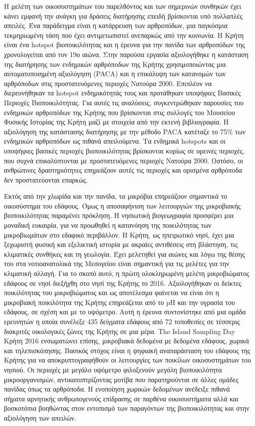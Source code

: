\documentclass[11pt]{article}
\begin{document}
Η μελέτη των οικοσυστημάτων του παρελθόντος και των σημερινών συνθηκών έχει κάνει εμφανή την ανάγκη για
δράσεις διατήρησης επειδή βρίσκονται υπό πολλαπλές απειλές.
Ένα παράδειγμα είναι η κατάρρευση των αρθροπόδων, μια παγκόσμια τεκμηριωμένη
τάση που έχει αντιμετωπιστεί ανεπαρκώς από την κοινωνία.
Η Κρήτη είναι ένα hotspot βιοποικιλότητας και η έρευνα για την πανίδα των αρθροπόδων της χρονολογείται από τον 19ο αιώνα.
Στην παρούσα εργασία αξιολογήθηκε η κατάσταση της διατήρησης των ενδημικών αρθρόποδων της Κρήτης χρησιμοποιώντας
μια αυτοματοποιημένη αξιολόγηση (\textlatin{PACA}) και η επικάλυψη των κατανομών των αρθρόποδων
στις προστατευόμενες περιοχές Νατούρα 2000. Επιπλέον 
να διερευνήθηκαν τα \textlatin{hotspot} ενδημικότητάς τους και προτάθηκαν υποψήφιες Βασικές Περιοχές Βιοποικιλότητας.
Για αυτές τις αναλύσεις, συγκεντρώθηκαν παρουσίες του ενδημικών αρθροπόδων της Κρήτης
που βρίσκονται στις συλλογές του Μουσείου Φυσικής Ιστορίας της
Κρήτη μαζί με στοιχεία από την εκτενή βιβλιογραφία. Η αξιολόγηση της κατάστασης διατήρησης με την μέθοδο PACA
κατέταξε το 75\% των ενδημικών αρθροπόδων ως πιθανά απειλούμενα.
Τα ενδημικά \textlatin{hotspots} και οι υποψήφιες βασικές περιοχές βιοποικιλότητας βρίσκονται κυρίως σε
ορεινές περιοχές, που συχνά επικαλύπτονται με προστατευόμενες περιοχές Νατούρα 2000.
Ωστόσο, οι ανθρώπινες δραστηριότητες επηρεάζουν αυτές τις περιοχές και ορισμένα αρθρόποδα δεν 
προστατεύονται επαρκώς.

Εκτός από την χλωρίδα και την πανίδα, τα μικρόβια επηρεάζουν σημαντικά το οικοσύστημα του εδάφους.
Όμως η αποσαφήνιση των λειτουργιών της μικροβιακής βιοποικιλότητας παραμένει πρόκληση.
Η νησιωτική βιογεωγραφία προσφέρει μια μοναδική ευκαιρία, για να προωθηθεί η κατανόηση
της ποικιλότητας των μικροβιωμάτων στο εδαφικό περιβάλλον.
Η Κρήτη, ως ηπειρωτικό νησί, έχει μια ξεχωριστή φυσική και εξελικτική ιστορία
με ακραίες αντιθέσεις στη βλάστηση, τις κλιματικές συνθήκες και τη γεωλογία.
Έχει μελετηθεί για αιώνες και λόγω της θέσης του στα νοτιοανατολικά
της Μεσογείου είναι σημαντική για τις μελέτες για την κλιματική αλλαγή.
Για το σκοπό αυτό, η πρώτη ολοκληρωμένη μελέτη μικροβιώματος εδάφους σε νησί διεξήχθη στο
νησί της Κρήτης το 2016. Αξιολογήθηκαν οι δείκτες ποικιλότητας του μικροβιώματος και ως αποτέλεσμα
φαίνεται να είναι ότι η μικροβιακή ποικιλότητα της Κρήτης επηρεάζεται από το \textlatin{pH} και
την υγρασία του εδάφους, σε σχέση και με το υψόμετρο. Αυτή η έρευνα συντονίστηκε από μια ομάδα ερευνητών η οποία συνέλεξε 435 δείγματα εδάφους
από 72 τοποθεσίες σε τέσσερις διακριτές οικολογικές ζώνες της Κρήτης σε μια μέρα. The \textlatin{Island Sampling Day} Κρήτη 2016
ενσωματώνει επίσης, μικροβιακά δεδομένα με δεδομένα εδάφους, χωρικά και τηλεπισκόπησης.
Βασικός στόχος είναι η ψηφιακή αναπαράσταση του εδάφους της Κρήτης για να αποκρυπτογραφήθούν
οι λειτουργίες των ποικίλων οικοσυστημάτων του νησιού. Οι περιοχές με μεγάλο υψόμετρο φιλοξενούν μεγάλη βιοποικιλότητα
μικροοργανισμών, αντικατοπτρίζοντας μοτίβα που παρατηρούνται σε άλλες ομάδες πανίδας όπως τα αρθρόποδα.
Η ενοποίηση χωρικών δεδομένων ανέδειξε πιθανά σήματα αρνητικής ανθρωπογενούς επίδρασης σε παρθένα οικοσυστήματα αλλά και 
βοσκοτόπια βοηθώντας στον εντοπισμό των παραγόντων της βιοποικιλότητας και στην αξιολόγηση των απειλών.
\end{document}
